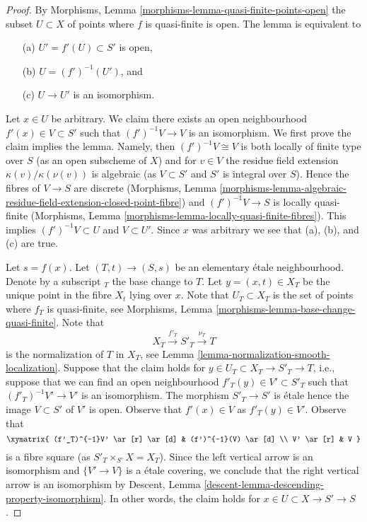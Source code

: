 \begin{proof}
By Morphisms, Lemma \ref{morphisms-lemma-quasi-finite-points-open}
the subset $U \subset X$ of points where $f$ is quasi-finite is open.
The lemma is equivalent to
\begin{enumerate}
\item[(a)] $U' = f'(U) \subset S'$ is open,
\item[(b)] $U = (f')^{-1}(U')$, and
\item[(c)] $U \to U'$ is an isomorphism.
\end{enumerate}
Let $x \in U$ be arbitrary. We claim there exists an open
neighbourhood $f'(x) \in V \subset S'$ such that $(f')^{-1}V \to V$ is an
isomorphism. We first prove the claim implies the lemma.
Namely, then $(f')^{-1}V \cong V$ is both locally of finite
type over $S$ (as an open subscheme of $X$) and for $v \in V$ the residue
field extension $\kappa(v)/\kappa(\nu(v))$ is algebraic (as
$V \subset S'$ and $S'$ is integral over $S$). Hence the fibres
of $V \to S$ are discrete (Morphisms, Lemma
\ref{morphisms-lemma-algebraic-residue-field-extension-closed-point-fibre})
and $(f')^{-1}V \to S$ is locally quasi-finite
(Morphisms, Lemma \ref{morphisms-lemma-locally-quasi-finite-fibres}).
This implies $(f')^{-1}V \subset U$ and $V \subset U'$. Since $x$ was
arbitrary we see that (a), (b), and (c) are true.

\medskip\noindent
Let $s = f(x)$. Let $(T, t) \to (S, s)$ be an elementary \'etale
neighbourhood. Denote by a subscript ${}_T$ the base change to $T$.
Let $y = (x, t) \in X_T$ be the unique point in
the fibre $X_t$ lying over $x$. Note that $U_T \subset X_T$
is the set of points where $f_T$ is quasi-finite, see
Morphisms, Lemma \ref{morphisms-lemma-base-change-quasi-finite}.
Note that
$$
X_T \xrightarrow{f'_T} S'_T \xrightarrow{\nu_T} T
$$
is the normalization of $T$ in $X_T$, see
Lemma \ref{lemma-normalization-smooth-localization}.
Suppose that the claim holds for $y \in U_T \subset X_T \to S'_T \to T$, i.e.,
suppose that we can find an open neighbourhood
$f'_T(y) \in V' \subset S'_T$ such that $(f'_T)^{-1}V' \to V'$ is an
isomorphism. The morphism $S'_T \to S'$ is \'etale hence the image
$V \subset S'$ of $V'$ is open. Observe that $f'(x) \in V$ as $f'_T(y) \in V'$.
Observe that
$$
\xymatrix{
(f'_T)^{-1}V' \ar[r] \ar[d] & (f')^{-1}(V) \ar[d] \\
V' \ar[r] & V
}
$$
is a fibre square (as $S'_T \times_{S'} X = X_T$).
Since the left vertical arrow is an isomorphism
and $\{V' \to V\}$ is a \'etale covering, we conclude that the right vertical
arrow is an isomorphism by
Descent, Lemma \ref{descent-lemma-descending-property-isomorphism}.
In other words, the claim holds for $x \in U \subset X \to S' \to S$.


\end{proof}
